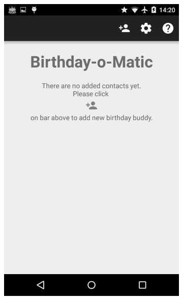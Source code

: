 \begin{figure}[ht]
    \centering
    \begin{subfigure}[b]{0.35\textwidth}
        \includegraphics[width=\textwidth]{./img/nexus4/4.png}
        \label{fig:res_tom}
    \end{subfigure}
    \begin{subfigure}[b]{0.35\textwidth}

\end{subfigure}
\end{figure}
